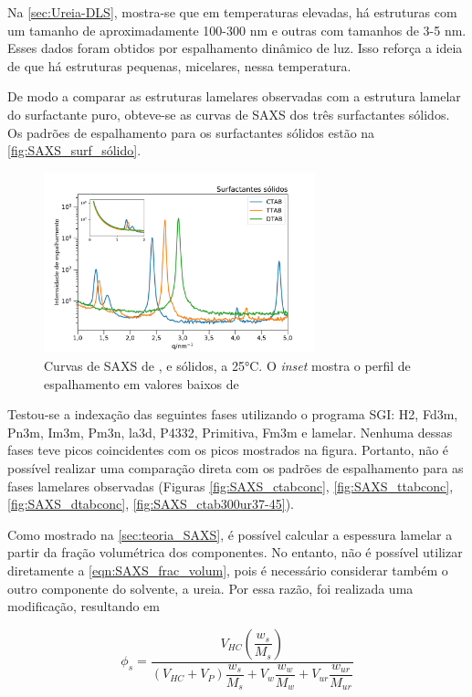 	Na \autoref{sec:Ureia-DLS}, mostra-se que em temperaturas elevadas, há estruturas com um tamanho de aproximadamente 100-300 nm e outras com tamanhos de 3-5 nm. Esses dados foram obtidos por espalhamento dinâmico de luz. Isso reforça a ideia de que há estruturas pequenas, micelares, nessa temperatura.
	 
	De modo a comparar as estruturas lamelares observadas com a estrutura lamelar do surfactante puro, obteve-se as curvas de SAXS dos três surfactantes sólidos. Os padrões de espalhamento para os surfactantes sólidos estão na \autoref{fig:SAXS_surf_sólido}.

	\begin{figure}[h]
		\centering
		\includegraphics[width=0.7\textwidth]{imagens/saxs/surfactante_solido}
		\caption{Curvas de SAXS de \CTAB{}, \TTAB{} e \DTAB{} sólidos, a 25°C. O \emph{inset} mostra o perfil de espalhamento em valores baixos de \q}
		\label{fig:SAXS_surf_sólido}
	\end{figure} 
	
	Testou-se a indexação das seguintes fases utilizando o programa SGI: H2, Fd3m, Pn3m, Im3m, Pm3n, la3d, P4332, Primitiva, Fm3m e lamelar. Nenhuma dessas fases teve picos coincidentes com os picos mostrados na figura. Portanto, não é possível realizar uma comparação direta com os padrões de espalhamento para as fases lamelares observadas (Figuras \ref{fig:SAXS_ctabconc}, \ref{fig:SAXS_ttabconc}, \ref{fig:SAXS_dtabconc}, \ref{fig:SAXS_ctab300ur37-45}).
	
	Como mostrado na \autoref{sec:teoria_SAXS}, é possível calcular a espessura lamelar a partir da fração volumétrica dos componentes. No entanto, não é possível utilizar diretamente a \autoref{eqn:SAXS_frac_volum}, pois é necessário considerar também o outro componente do solvente, a ureia. Por essa razão, foi realizada uma modificação, resultando em
	
	\begin{equation}
		\phi_s = \dfrac{V_{\textit{HC}}\left( \dfrac{w_{s}}{M_{s}} \right)}{\left( V_{\textit{HC}} + V_{P} \right)\dfrac{w_{s}}{M_{s}} + V_{w}\dfrac{w_{w}}{M_{w}} + V_{\textit{ur}}\dfrac{w_{\textit{ur}}}{M_{\textit{ur}}}}
		\label{eqn:SAXS_frac_volum_com_ureia}
	\end{equation} 

